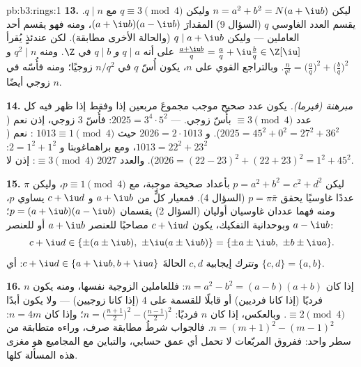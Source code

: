 \begin{solution}{pb:b3:rings:1}
\textbf{13.} ليكن $n = a^2 + b^2 = N(a + \iu b)$ وليكن $q \equiv 3
\pmod 4$ مع $q \mid n$. يقسم
العدد الغاوسي  $q$ (السؤال 9) المقدارَ $(a + \iu b)(a - \iu b)$، ومنه فهو
يقسم أحد العاملين --- وليكن $q
\mid a + \iu b$ (والحالة الأخرى مطابقة).
لكن عندئذٍ يُقرأ $\frac{a +
\iu b}{q} = \frac aq + \iu \frac bq \in \Z[\iu]$ على أنه $q
\mid a$ \emph{و} $q \mid b$
في $\Z$. ومنه $q^2 \mid n$ و $\frac n{q^2} =
\bigl(\frac aq\bigr)^2 + \bigl(\frac bq\bigr)^2$. وبالتراجع القوي على $n$،
يكون أُسّ $q$ في $n/q^2$ زوجيًا؛ ومنه فأُسّه في $n$ زوجي أيضًا.

\textbf{14.} \emph{مبرهنة (فيرما).} يكون عدد صحيح موجب مجموعَ
مربعين إذا وفقط إذا ظهر فيه كل عدد  $\equiv 3 \pmod 4$ بأُسّ زوجي. ---
$2025 = 3^4 \cdot 5^2$: فأُسّ $3$ زوجي، إذن نعم ($2025 = 45^2 + 0^2 = 27^2 + 36^2$). و $2026 = 2 \cdot 1013$ حيث
$1013 \equiv 1 \pmod 4$ : نعم ($1013 = 22^2 + 23^2$، ومع براهماغوبتا و $2 = 1^2+1^2$:
$2026 = (22 - 23)^2 + (22 + 23)^2 = 1^2 + 45^2$). والعدد $2027$  $\equiv 3 \pmod 4$: إذن لا.

\textbf{15.} ليكن $p = a^2 + b^2 = c^2 + d^2$ بأعداد صحيحة موجبة، مع $p \equiv 1 \pmod 4$،
وليكن $\pi$ عددًا غاوسيًا  يحقق $p = \pi\bar\pi$ (السؤال
4). فمعيار كلٍّ من $a + \iu b$ و $c + \iu d$ يساوي $p$، ومنه
فهما عددان غاوسيان أوليان (السؤال 2) يقسمان $p = (a+\iu b)(a - \iu b)$؛ وبوحدانية
التفكيك، يكون $c +
\iu d$ مصاحبًا للعنصر $a + \iu b$ أو للعنصر $a - \iu b$:
\[
c + \iu d \in \{\pm(a \pm \iu b),\ \pm\iu(a \pm \iu b)\}
= \{\pm a \pm \iu b,\ \pm b \pm \iu a\}.
\]
وتترك إيجابية $c, d$ الحالةَ $c + \iu d \in \{a + \iu b, b + \iu
a\}$: أي $\{c, d\} = \{a, b\}$.

\textbf{16.} إذا كان $n = a^2 - b^2 = (a-b)(a+b)$: فللعاملين الزوجية نفسها، ومنه
يكون $n$ فرديًا (إذا كانا فرديين) أو قابلًا للقسمة على $4$ (إذا
كانا زوجيين) --- ولا يكون أبدًا $\equiv 2 \pmod 4$. وبالعكس، إذا كان $n$
فرديًا: $n = \bigl(\frac{n+1}2\bigr)^2 -
\bigl(\frac{n-1}2\bigr)^2$؛ وإذا كان $n = 4m$: $n = (m+1)^2 - (m-1)^2$. فالجواب شرطُ
مطابقة صرف، وراءه متطابقة من سطر واحد: ففروق المربّعات لا تحمل
أي عمق حسابي، والتباين مع المجاميع هو مغزى هذه المسألة كلها.


\end{solution}
